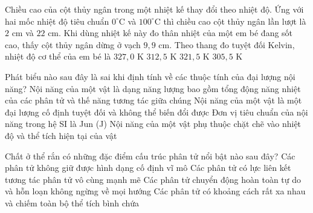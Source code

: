 \begin{ex}	Chiều cao của cột thủy ngân trong một nhiệt kế thay đổi theo nhiệt độ. Ứng với hai mốc nhiệt độ tiêu chuẩn $0^\circ\text{C}$ và $100^\circ\text{C}$ thì chiều cao cột thủy ngân lần lượt là $2\text{ cm}$ và $22\text{ cm}$. Khi dùng nhiệt kế này đo thân nhiệt của một em bé đang sốt cao, thấy cột thủy ngân dừng ở vạch $9,9\text{ cm}$. Theo thang đo tuyệt đối Kelvin, nhiệt độ cơ thể của em bé là
	\choice
	{$327,0\text{ K}$}
	{\True $312,5\text{ K}$}
	{$321,5\text{ K}$}
	{$305,5\text{ K}$}
\end{ex}

\begin{ex}	Phát biểu nào sau đây là sai khi định tính về các thuộc tính của đại lượng nội năng?
	\choice
	{Nội năng của một vật là dạng năng lượng bao gồm tổng động năng nhiệt của các phân tử và thế năng tương tác giữa chúng}
	{\True Nội năng của một vật là một đại lượng cố định tuyệt đối và không thể biến đổi được}
	{Đơn vị tiêu chuẩn của nội năng trong hệ SI là Jun (J)}
	{Nội năng của một vật phụ thuộc chặt chẽ vào nhiệt độ và thể tích hiện tại của vật}
\end{ex}

\begin{ex}	Chất ở thể rắn có những đặc điểm cấu trúc phân tử nổi bật nào sau đây?
	\choice
	{Các phân tử không giữ được hình dạng cố định vĩ mô}
	{\True Các phân tử có lực liên kết tương tác phân tử vô cùng mạnh mẽ}
	{Các phân tử chuyển động hoàn toàn tự do và hỗn loạn không ngừng về mọi hướng}
	{Các phân tử có khoảng cách rất xa nhau và chiếm toàn bộ thể tích bình chứa}
\end{ex}

